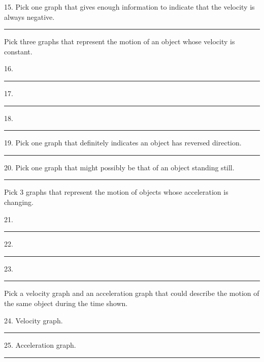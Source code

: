 15. Pick one graph that gives enough information to indicate that the velocity
is always negative. \rule{0.5in}{0.1pt}

Pick three graphs that represent the motion of an object whose velocity is constant.

16. \rule{0.5in}{0.1pt} 17. \rule{0.5in}{0.1pt} 18. \rule{0.5in}{0.1pt}

19. Pick one graph that definitely indicates an object has reversed direction.
\rule{0.5in}{0.1pt}

20. Pick one graph that might possibly be that of an object standing still.
\rule{0.5in}{0.1pt}

Pick 3 graphs that represent the motion of objects whose acceleration is changing.

21. \rule{0.5in}{0.1pt} 22. \rule{0.5in}{0.1pt} 23. \rule{0.5in}{0.1pt}

Pick a velocity graph and an acceleration graph that could describe the motion
of the same object during the time shown.

24. Velocity graph. \rule{0.5in}{0.1pt} 25. Acceleration graph. \rule{0.5in}{0.1pt}

